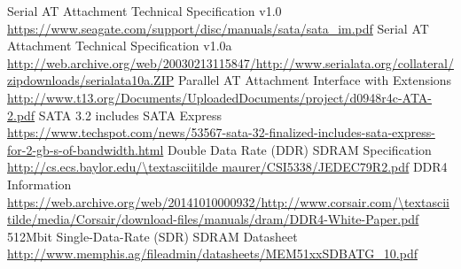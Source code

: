 \documentclass{article}
\begin{document}
	\pagebreak
	\begin{thebibliography}{9}
		 Serial AT Attachment Technical Specification v1.0 \\ \url{https://www.seagate.com/support/disc/manuals/sata/sata\_im.pdf}
		 Serial AT Attachment Technical Specification v1.0a \\ \url{http://web.archive.org/web/20030213115847/http://www.serialata.org/collateral/zipdownloads/serialata10a.ZIP}
		 Parallel AT Attachment Interface with Extensions \\ \url{http://www.t13.org/Documents/UploadedDocuments/project/d0948r4c-ATA-2.pdf}
		 SATA 3.2 includes SATA Express \\ \url{https://www.techspot.com/news/53567-sata-32-finalized-includes-sata-express-for-2-gb-s-of-bandwidth.html}
		 Double Data Rate (DDR) SDRAM Specification \\ \url{http://cs.ecs.baylor.edu/\textasciitilde maurer/CSI5338/JEDEC79R2.pdf} 
		 DDR4 Information \\ \url{https://web.archive.org/web/20141010000932/http://www.corsair.com/\textasciitilde/media/Corsair/download-files/manuals/dram/DDR4-White-Paper.pdf}
		 512Mbit Single-Data-Rate (SDR) SDRAM Datasheet \\ \url{http://www.memphis.ag/fileadmin/datasheets/MEM51xxSDBATG\_10.pdf}
	\end{thebibliography}
\end{document}
